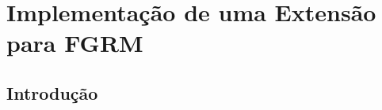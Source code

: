\chapter{Implementação de uma Extensão para FGRM}
\label{ch:implemtacao_extensao}

\section{Introdução}
\label{sec:implemtacao_extensao_intro}




